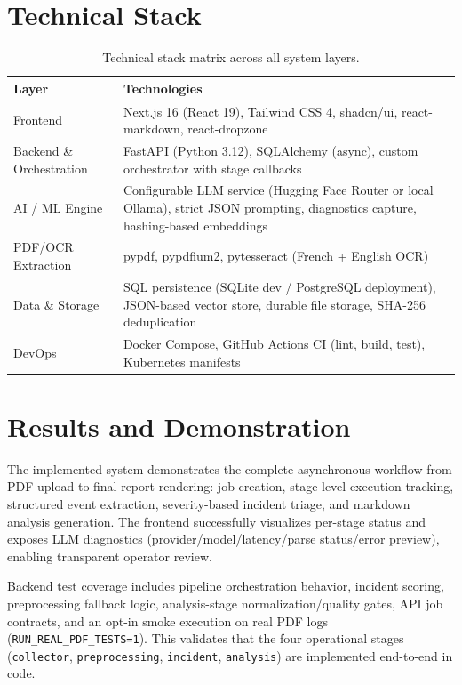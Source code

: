 \documentclass[11pt,a4paper]{article}
\begin{document}
\section{Technical Stack}

\begin{table}[H]
\centering
\small
\begin{tabularx}{\textwidth}{lX}
\toprule
\textbf{Layer} & \textbf{Technologies} \\
\midrule
Frontend & Next.js 16 (React 19), Tailwind CSS 4, shadcn/ui, react-markdown, react-dropzone \\
Backend \& Orchestration & FastAPI (Python 3.12), SQLAlchemy (async), custom orchestrator with stage callbacks \\
AI / ML Engine & Configurable LLM service (Hugging Face Router or local Ollama), strict JSON prompting, diagnostics capture, hashing-based embeddings \\
PDF/OCR Extraction & pypdf, pypdfium2, pytesseract (French + English OCR) \\
Data \& Storage & SQL persistence (SQLite dev / PostgreSQL deployment), JSON-based vector store, durable file storage, SHA-256 deduplication \\
DevOps & Docker Compose, GitHub Actions CI (lint, build, test), Kubernetes manifests \\
\bottomrule
\end{tabularx}
\caption{Technical stack matrix across all system layers.}
\label{tab:stack}
\end{table}

\section{Results and Demonstration}

The implemented system demonstrates the complete asynchronous workflow from PDF upload to final report rendering: job creation, stage-level execution tracking, structured event extraction, severity-based incident triage, and markdown analysis generation. The frontend successfully visualizes per-stage status and exposes LLM diagnostics (provider/model/latency/parse status/error preview), enabling transparent operator review.

Backend test coverage includes pipeline orchestration behavior, incident scoring, preprocessing fallback logic, analysis-stage normalization/quality gates, API job contracts, and an opt-in smoke execution on real PDF logs (\texttt{RUN\_REAL\_PDF\_TESTS=1}). This validates that the four operational stages (\texttt{collector}, \texttt{preprocessing}, \texttt{incident}, \texttt{analysis}) are implemented end-to-end in code.
\end{document}
